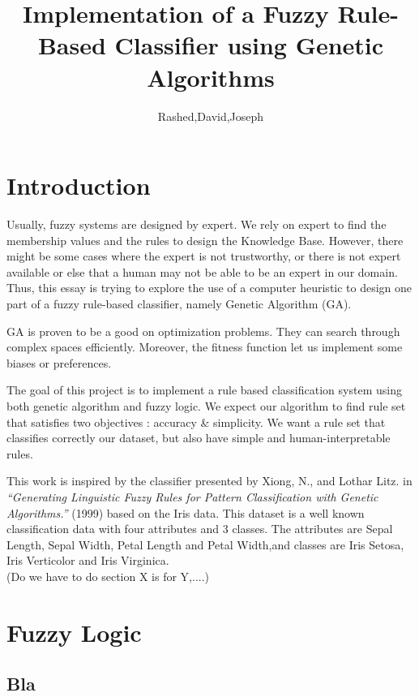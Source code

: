\documentclass[a4paper,12pt]{article}
\begin{document}
\title{Implementation of a Fuzzy Rule-Based Classifier using Genetic Algorithms}
\author{Rashed,David,Joseph}
\maketitle

\section{Introduction}

Usually, fuzzy systems are designed by expert. We rely on expert to find the membership values and the rules to design the Knowledge Base.
However, there might be some cases where the expert is not trustworthy, or there is not expert available or else that a human may not be able to be an expert in our domain. Thus, this essay is trying to explore the use of a computer heuristic to design one part of a fuzzy rule-based classifier, namely Genetic Algorithm (GA).

GA is proven to be a good on optimization problems. They can search through complex spaces efficiently. Moreover, the fitness function let us implement some biases or preferences.

The goal of this project is to implement a rule based classification system using both genetic algorithm and fuzzy logic.
We expect our algorithm to find rule set that satisfies two objectives : accuracy \& simplicity.
We want a rule set that classifies correctly our dataset, but also have simple and human-interpretable rules. 

This work is inspired by the classifier presented by Xiong, N., and Lothar Litz. in \textit{“Generating Linguistic Fuzzy Rules for Pattern Classification with Genetic Algorithms.”} (1999) based on the Iris data. This dataset is a well known classification data with four attributes and 3 classes. The attributes are Sepal Length, Sepal Width, Petal Length and Petal Width,and classes are Iris Setosa, Iris Verticolor and Iris Virginica. \\

(Do we have to do section X is for Y,....)

\section{Fuzzy Logic}

\subsection{Bla}
\end{document}
